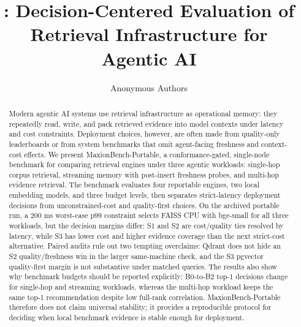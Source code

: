 \documentclass{article}
\title{\sys: Decision-Centered Evaluation of Retrieval Infrastructure for Agentic AI}
\author{Anonymous Authors}
\newcommand{\sys}{MaxionBench-Portable\xspace}
\begin{document}
\maketitle

\begin{abstract}
Modern agentic AI systems use retrieval infrastructure as operational memory: they repeatedly read, write, and pack retrieved evidence into model contexts under latency and cost constraints. Deployment choices, however, are often made from quality-only leaderboards or from system benchmarks that omit agent-facing freshness and context-cost effects. We present \sys, a conformance-gated, single-node benchmark for comparing retrieval engines under three agentic workloads: single-hop corpus retrieval, streaming memory with post-insert freshness probes, and multi-hop evidence retrieval. The benchmark evaluates four reportable engines, two local embedding models, and three budget levels, then separates strict-latency deployment decisions from unconstrained-cost and quality-first choices. On the archived portable run, a 200 ms worst-case p99 constraint selects FAISS CPU with bge-small for all three workloads, but the decision margins differ: S1 and S2 are cost/quality ties resolved by latency, while S3 has lower cost and higher evidence coverage than the next strict-cost alternative. Paired audits rule out two tempting overclaims: Qdrant does not hide an S2 quality/freshness win in the larger same-machine check, and the S3 pgvector quality-first margin is not substantive under matched queries. The results also show why benchmark budgets should be reported explicitly: B0-to-B2 top-1 decisions change for single-hop and streaming workloads, whereas the multi-hop workload keeps the same top-1 recommendation despite low full-rank correlation. \sys therefore does not claim universal stability; it provides a reproducible protocol for deciding when local benchmark evidence is stable enough for deployment.
\end{abstract}










\appendix



\end{document}
